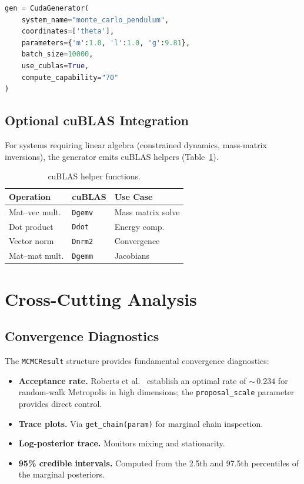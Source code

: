 \documentclass[11pt,letterpaper,twocolumn]{article}
\newcommand{\code}[1]{\texttt{#1}}
\theoremstyle{definition}
\begin{document}
\begin{lstlisting}[language=Python,caption={Batch Monte Carlo code generation.}]
gen = CudaGenerator(
    system_name="monte_carlo_pendulum",
    coordinates=['theta'],
    parameters={'m':1.0, 'l':1.0, 'g':9.81},
    batch_size=10000,
    use_cublas=True,
    compute_capability="70"
)
\end{lstlisting}

\subsection{Optional cuBLAS Integration}

For systems requiring linear algebra (constrained dynamics, mass-matrix inversions), the generator emits cuBLAS helpers (Table~\ref{tab:cublas}).

\begin{table}[H]
\centering
\caption{cuBLAS helper functions.}\label{tab:cublas}
\small
\setlength{\tabcolsep}{4pt}
\begin{tabular}{@{}lll@{}}
\toprule
\textbf{Operation} & \textbf{cuBLAS} & \textbf{Use Case} \\
\midrule
Mat--vec mult. & \code{Dgemv} & Mass matrix solve \\
Dot product    & \code{Ddot}  & Energy comp. \\
Vector norm    & \code{Dnrm2} & Convergence \\
Mat--mat mult. & \code{Dgemm} & Jacobians \\
\bottomrule
\end{tabular}
\end{table}

\section{Cross-Cutting Analysis}\label{sec:cross}

\subsection{Convergence Diagnostics}

The \code{MCMCResult} structure provides fundamental convergence diagnostics:

\begin{itemize}
  \item \textbf{Acceptance rate.} Roberts et al.~\cite{roberts1997} establish an optimal rate of ${\sim}\,0.234$ for random-walk Metropolis in high dimensions; the \code{proposal\_scale} parameter provides direct control.
  \item \textbf{Trace plots.} Via \code{get\_chain(param)} for marginal chain inspection.
  \item \textbf{Log-posterior trace.} Monitors mixing and stationarity.
  \item \textbf{95\% credible intervals.} Computed from the 2.5th and 97.5th percentiles of the marginal posteriors.
\end{itemize}
\end{document}

